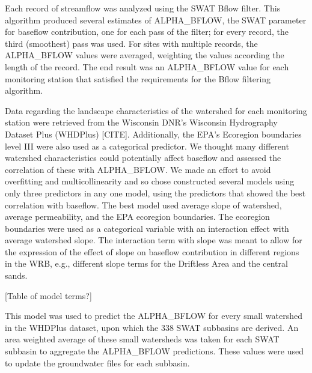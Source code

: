 	Each record of streamflow was analyzed using the SWAT Bflow filter. This algorithm produced several estimates of ALPHA\_BFLOW, the SWAT parameter for baseflow contribution, one for each pass of the filter; for every record, the third (smoothest) pass was used. For sites with multiple records, the ALPHA\_BFLOW values were averaged, weighting the values according the length of the record. The end result was an ALPHA\_BFLOW value for each monitoring station that satisfied the requirements for the Bflow filtering algorithm.  

	Data regarding the landscape characteristics of the watershed for each monitoring station were retrieved from the Wisconsin DNR's Wisconsin Hydrography Dataset Plus (WHDPlus) [CITE]. Additionally, the EPA's Ecoregion boundaries level III were also used as a categorical predictor. We thought many different watershed characteristics could potentially affect baseflow and assessed the correlation of these with ALPHA\_BFLOW. We made an effort to avoid overfitting and multicollinearity and so chose constructed several models using only three predictors in any one model, using the predictors that showed the best correlation with baseflow.  The best model used average slope of watershed, average permeability, and the EPA ecoregion boundaries. The ecoregion boundaries were used as a categorical variable with an interaction effect with average watershed slope. The interaction term with slope was meant to allow for the expression of the effect of slope on baseflow contribution in different regions in the WRB, e.g., different slope terms for the Driftless Area and the central sands. 
	
	[Table of model terms?]
	
	This model was used to predict the ALPHA\_BFLOW for every small watershed in the WHDPlus dataset, upon which the 338 SWAT subbasins are derived. An area weighted average of these small watersheds was taken for each SWAT subbasin to aggregate the ALPHA\_BFLOW predictions. These values were used to update the groundwater files for each subbasin.